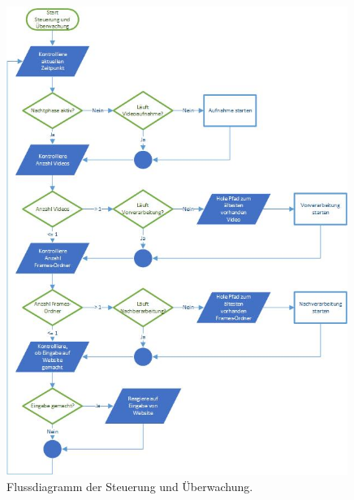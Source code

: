 \begin{figure}[H]
  \centering
  \includegraphics[width=0.99\textwidth]{Software/Fluss_SuU.jpg} 
  \caption{Flussdiagramm der Steuerung und Überwachung.}
  \label{bFlussSuU}
\end{figure}